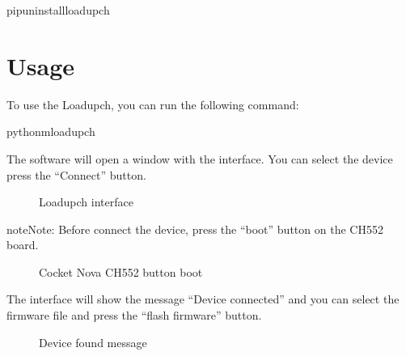 \documentclass[letterpaper,10pt,english]{sphinxmanual}
\begin{document}
\begin{sphinxVerbatim}[commandchars=\\\{\}]
pipuninstallloadupch
\end{sphinxVerbatim}

\sphinxstepscope


\chapter{Usage}
\label{\detokenize{usage:usage}}\label{\detokenize{usage::doc}}
\sphinxAtStartPar
To use the Loadupch, you can run the following command:

\begin{sphinxVerbatim}[commandchars=\\\{\}]
python\PYGZhy{}mloadupch
\end{sphinxVerbatim}

\sphinxAtStartPar
The software will open a window with the interface. You can select the device press the “Connect” button.

\begin{figure}[htbp]
\centering
\capstart

\noindent{}
\caption{Loadupch interface}\label{\detokenize{usage:id1}}\label{\detokenize{usage:figure-connect}}\end{figure}

\begin{sphinxadmonition}{note}{Note:}
\sphinxAtStartPar
Before connect the device, press the “boot” button on the CH552 board.
\end{sphinxadmonition}

\begin{figure}[htbp]
\centering
\capstart

\noindent{}
\caption{Cocket Nova CH552 button boot}\label{\detokenize{usage:id2}}\label{\detokenize{usage:figure-flash}}\end{figure}

\sphinxAtStartPar
The interface will show the message “Device connected” and you can select the firmware file and press the “flash firmware” button.

\begin{figure}[htbp]
\centering
\capstart

\noindent{}
\caption{Device found message}\label{\detokenize{usage:id3}}\label{\detokenize{usage:figure-message}}\end{figure}
\end{document}
